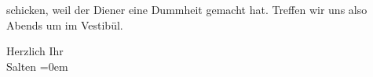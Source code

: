                schicken, weil der Diener eine Dummheit gemacht hat. Treffen wir uns also
                  Abends um \label{K_L03278-2v}\label{K_L03278-2} im Vestibül.\pend
           
\pstart
           Herzlich Ihr {\\[\baselineskip]}\spacefill\mbox{Salten}\pend
           \leftskip=0em{}\endnumbering{}  \newcommand{\dateiname}{L03278}\newcommand{\titel}{Felix Salten an Arthur Schnitzler, [4. 1.? 1898]}\newcommand{\editorInnen}{Martin Anton Müller und Laura Untner}
